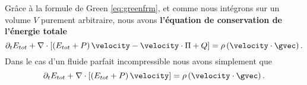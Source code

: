 \begin{refe}
Grâce à la formule de Green \eqref{eq:greenfrm}, et comme nous intégrons sur un volume $V$ purement arbitraire, nous avons \textbf{l'équation de conservation de l'énergie totale}
\begin{equation}
	\partial_t E_{tot} + \nabla \cdot \left[\left(E_{tot} + P\right)\velocity - \velocity\cdot\Pi + Q\right] = \rho \left(\velocity\cdot \gvec\right).\label{eq:consenergy}
\end{equation}
Dans le cas d'un fluide parfait incompressible nous avons simplement que
\begin{equation}
	\partial_t E_{tot} + \nabla \cdot \left[\left(E_{tot} + P\right)\velocity \right] = \rho \left(\velocity\cdot \gvec\right).\label{eq:consenergyI}
\end{equation}
\end{refe}


